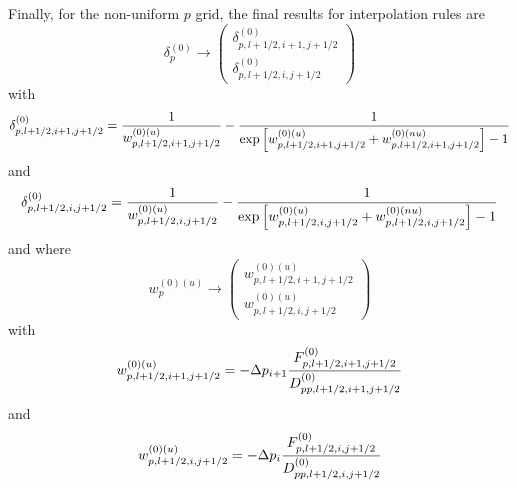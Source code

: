 Finally, for the non-uniform $p$ grid, the final results for interpolation
rules are
\begin{equation}
\delta _{p}^{\left( 0\right) }\rightarrow \left(
\begin{array}{l}
\delta _{p,l+1/2,i+1,j+1/2}^{\left( 0\right) } \\
\delta _{p,l+1/2,i,j+1/2}^{\left( 0\right) }
\end{array}
\right)
\end{equation}
with
\begin{equation}
\delta _{p,l+1/2,i+1,j+1/2}^{\left( 0\right) }=\frac{1}{%
w_{p,l+1/2,i+1,j+1/2}^{\left( 0\right) (u)}}-\frac{1}{\exp \left[
w_{p,l+1/2,i+1,j+1/2}^{\left( 0\right) (u)}+w_{p,l+1/2,i+1,j+1/2}^{\left(
0\right) (nu)}\right] -1}
\end{equation}
and
\begin{equation}
\delta _{p,l+1/2,i,j+1/2}^{\left( 0\right) }=\frac{1}{w_{p,l+1/2,i,j+1/2}^{%
\left( 0\right) (u)}}-\frac{1}{\exp \left[ w_{p,l+1/2,i,j+1/2}^{\left(
0\right) (u)}+w_{p,l+1/2,i,j+1/2}^{\left( 0\right) (nu)}\right] -1}
\end{equation}
and where
\begin{equation}
w_{p}^{\left( 0\right) (u)}\rightarrow \left(
\begin{array}{l}
w_{p,l+1/2,i+1,j+1/2}^{\left( 0\right) (u)} \\
w_{p,l+1/2,i,j+1/2}^{\left( 0\right) (u)}
\end{array}
\right)
\end{equation}
with
\begin{equation}
w_{p,l+1/2,i+1,j+1/2}^{\left( 0\right) (u)}=-\Delta p_{i+1}\frac{%
F_{p,l+1/2,i+1,j+1/2}^{\left( 0\right) }}{D_{pp,l+1/2,i+1,j+1/2}^{\left(
0\right) }}
\end{equation}
and
\begin{equation}
w_{p,l+1/2,i,j+1/2}^{\left( 0\right) (u)}=-\Delta p_{i}\frac{%
F_{p,l+1/2,i,j+1/2}^{\left( 0\right) }}{D_{pp,l+1/2,i,j+1/2}^{\left(
0\right) }}
\end{equation}

